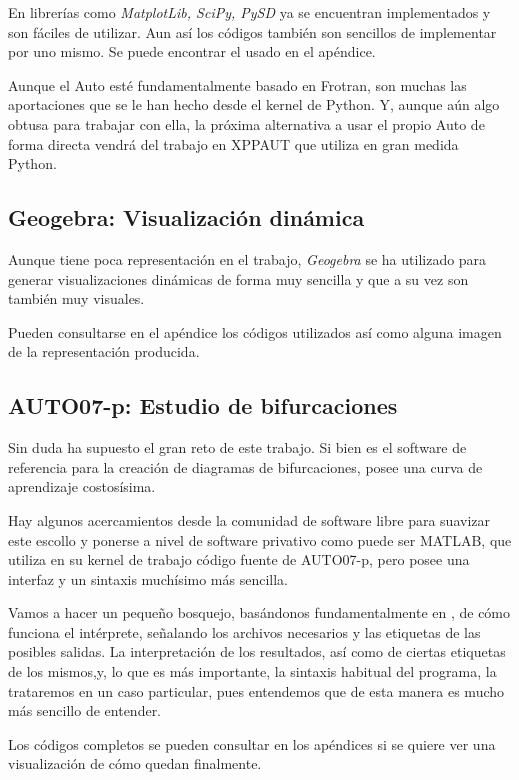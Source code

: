   En librerías como \textit{MatplotLib, SciPy, PySD} ya se encuentran implementados y son fáciles de utilizar.
  Aun así los códigos también son sencillos de implementar por uno mismo. Se puede encontrar el usado en el apéndice.
  
  Aunque el Auto esté fundamentalmente basado en Frotran, son muchas las aportaciones que se le han hecho desde el kernel de Python. Y, aunque aún algo obtusa para trabajar con ella, la próxima alternativa a usar el propio Auto de forma directa vendrá del trabajo en XPPAUT que utiliza en gran medida Python.
  
  \subsection{Geogebra: Visualización dinámica}
  Aunque tiene poca representación en el trabajo, \textit{Geogebra} se ha utilizado para generar visualizaciones dinámicas de forma muy sencilla y que a su vez son también muy visuales. 
  
  Pueden consultarse en el apéndice los códigos utilizados así como alguna imagen de la representación producida.
 
  \subsection{AUTO07-p: Estudio de bifurcaciones}
  Sin duda ha supuesto el gran reto de este trabajo. Si bien es el software de referencia para la creación de diagramas de bifurcaciones, posee una curva de aprendizaje costosísima.
  
  Hay algunos acercamientos desde la comunidad de software libre para suavizar este escollo y ponerse a nivel de software privativo como puede ser MATLAB, que utiliza en su kernel de trabajo código fuente de AUTO07-p, pero posee una interfaz y un sintaxis muchísimo más sencilla.
  
  
  Vamos a hacer un pequeño bosquejo, basándonos fundamentalmente en \cite{auto}, de cómo funciona el intérprete, señalando los archivos necesarios y las etiquetas de las posibles salidas. La interpretación de los resultados, así como  de ciertas etiquetas de los mismos,y, lo que es más importante, la sintaxis habitual del programa, la trataremos en un caso particular, pues entendemos que de esta manera es mucho más sencillo de entender.
  
  Los códigos completos se pueden consultar en los apéndices si se quiere ver una visualización de cómo quedan finalmente.
  
